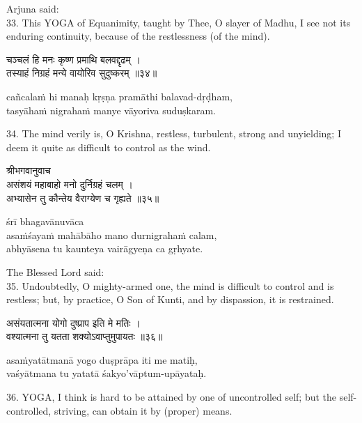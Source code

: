 Arjuna said: \\
33. This YOGA of Equanimity, taught by Thee, O slayer of Madhu, I see not its
enduring continuity, because of the restlessness (of the mind).

\begin{gitaverse}
चञ्चलं हि मनः कृष्ण प्रमाथि बलवद्दृढम् । \\
तस्याहं निग्रहं मन्ये वायोरिव सुदुष्करम् ॥३४॥
\end{gitaverse}

\begin{transliteration}
cañcalaṁ hi manaḥ kṛṣṇa pramāthi balavad-dṛḍham, \\
tasyāhaṁ nigrahaṁ manye vāyoriva suduṣkaram.
\end{transliteration}

34. The mind verily is, O Krishna, restless, turbulent, strong and unyielding;
I deem it quite as difficult to control as the wind.

\begin{gitaverse}
श्रीभगवानुवाच \\
असंशयं महाबाहो मनो दुर्निग्रहं चलम् । \\
अभ्यासेन तु कौन्तेय वैराग्येण च गृह्यते ॥३५॥
\end{gitaverse}

\begin{transliteration}
śrī bhagavānuvāca \\
asaṁśayaṁ mahābāho mano durnigrahaṁ calam, \\
abhyāsena tu kaunteya vairāgyeṇa ca gṛhyate.
\end{transliteration}

The Blessed Lord said: \\
35. Undoubtedly, O mighty-armed one, the mind is difficult to control and is
restless; but, by practice, O Son of Kunti, and by dispassion, it is
restrained.

\begin{gitaverse}
असंयतात्मना योगो दुष्प्राप इति मे मतिः । \\
वश्यात्मना तु यतता शक्योऽवाप्तुमुपायतः ॥३६॥
\end{gitaverse}

\begin{transliteration}
asaṁyatātmanā yogo duṣprāpa iti me matiḥ, \\
vaśyātmana tu yatatā śakyo'vāptum-upāyataḥ.
\end{transliteration}

36. YOGA, I think is hard to be attained by one of uncontrolled self; but the
self-controlled, striving, can obtain it by (proper) means.


